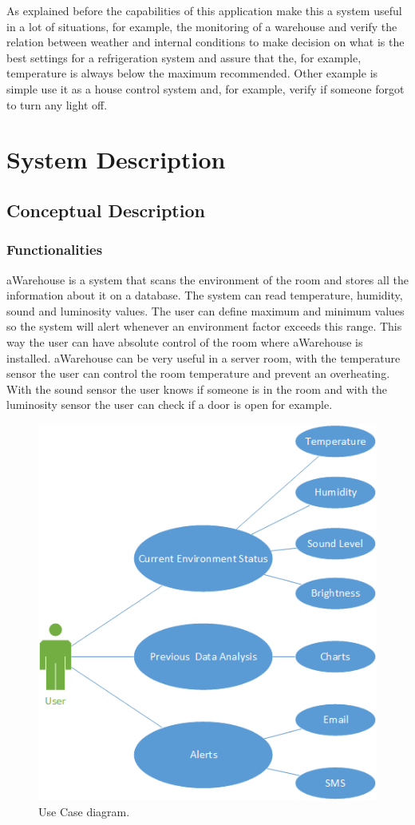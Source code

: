 \documentclass[12pt]{report}
\begin{document}
As explained before the capabilities of this application make this a system useful in a lot of situations, for example, the monitoring of a warehouse and verify the relation between weather and internal conditions to make decision on what is the best settings for a refrigeration system and assure that the, for example, temperature is always below the maximum recommended. Other example is simple use it as a house control system and, for example, verify if someone forgot to turn any light off.

\newpage
\chapter{System Description}
\section{Conceptual Description}
\subsection{Functionalities}
aWarehouse is a system that scans the environment of the room and stores all the information about it on a database.
The system can read temperature, humidity, sound and luminosity values. The user can define maximum and minimum values so the system will alert whenever an environment factor exceeds this range.
This way the user can have absolute control of the room where aWarehouse is installed. aWarehouse can be very useful in a server room, with the temperature sensor the user can control the room temperature and prevent an overheating. With the sound sensor the user knows if someone is in the room and with the luminosity sensor the user can check if a door is open for example.
\begin{figure}[h]
    \centering
    \includegraphics[scale=0.7]{use.png}
    \caption{Use Case diagram.}
    \label{fig:use}
\end{figure}
\end{document}
